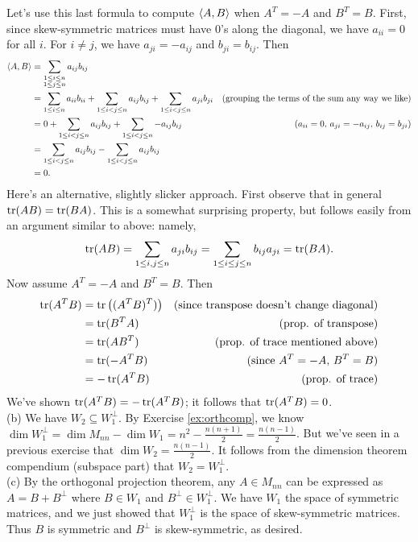 \begin{solution}
Let's use this last formula to compute $\langle A,B\rangle$ when $A^T=-A$ and $B^T=B$. First, since skew-symmetric matrices must have 0's along the diagonal, we have $a_{ii}=0$ for all $i$. For $i\ne j$, we have $a_{ji}=-a_{ij}$ and $b_{ji}=b_{ij}$. Then 
\begin{align*}
\langle A, B\rangle&=\sum_{\substack{1\leq i\leq n\\ 1\leq j\leq n}} a_{ij}b_{ij}\\
&=\sum_{1\leq i \leq n}a_{ii}b_{ii}+\sum_{1\leq i<j\leq n} a_{ij}b_{ij}+\sum_{1\leq i<j \leq n}a_{ji}b_{ji} &\text{(grouping the terms of the sum any way we like)}\\
&=0+\sum_{1\leq i<j\leq n} a_{ij}b_{ij}+\sum_{1\leq i<j \leq n}-a_{ij}b_{ij} &\text{($a_{ii}=0$, $a_{ji}=-a_{ij}$, $b_{ij}=b_{ji}$)}\\
&=\sum_{1\leq i<j\leq n} a_{ij}b_{ij}-\sum_{1\leq i<j\leq n} a_{ij}b_{ij}\\
&=0.
\end{align*}
Here's an alternative, slightly slicker approach. First observe that in general $\operatorname{tr}(AB)=\operatorname{tr}(BA)$. This is a somewhat surprising property, but follows easily from an argument similar to above: namely, 
\[
\operatorname{tr}(AB)=\sum_{1\leq i, j\leq n} a_{ji}b_{ij}=\sum_{1\leq i\leq j\leq n}b_{ij}a_{ji}=\operatorname{tr}(BA).
\]
Now assume $A^T=-A$ and $B^T=B$. Then 
\begin{align*}
\operatorname{tr}(A^TB)&=\operatorname{tr}\left( (A^TB)^T)\right) &\text{(since transpose doesn't change diagonal)}\\
&=\operatorname{tr}(B^TA) &\text{(prop. of transpose)}\\
&=\operatorname{tr}(AB^T) &\text{(prop. of trace mentioned above)}\\
&=\operatorname{tr}(-A^TB) &\text{(since $A^T=-A$, $B^T=B$)}\\
&=-\operatorname{tr}(A^TB) &\text{(prop. of trace)}
\end{align*}
We've shown $\operatorname{tr}(A^TB)=-\operatorname{tr}(A^TB)$; it follows that $\operatorname{tr}(A^TB)=0$. 
\\
(b) We have $W_2\subseteq W_1^\perp$. By Exercise \ref{ex:orthcomp}, we know $\dim W_1^\perp=\dim M_{nn}-\dim W_1=n^2-\frac{n(n+1)}{2}=\frac{n(n-1)}{2}$. But we've seen in a previous exercise that $\dim W_2=\frac{n(n-1)}{2}$. It follows from the dimension theorem compendium (subspace part) that $W_2=W_1^\perp$. 
\\
(c) By the orthogonal projection theorem, any $A\in M_{nn}$ can be expressed as $A=B+B^\perp$ where $B\in W_1$ and $B^\perp\in W_1^\perp$. We have $W_1$ the space of symmetric matrices, and we just showed that $W_1^\perp$ is the space of skew-symmetric matrices. Thus $B$ is symmetric and $B^\perp$ is skew-symmetric, as desired. 
\end{solution}
